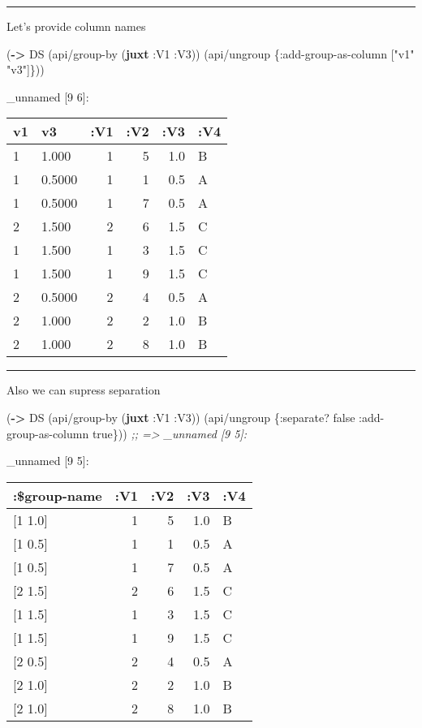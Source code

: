\documentclass[]{article}
\newenvironment{Shaded}{\begin{snugshade}}{\end{snugshade}}
\newcommand{\KeywordTok}[1]{\textcolor[rgb]{0.13,0.29,0.53}{\textbf{#1}}}
\newcommand{\StringTok}[1]{\textcolor[rgb]{0.31,0.60,0.02}{#1}}
\newcommand{\CommentTok}[1]{\textcolor[rgb]{0.56,0.35,0.01}{\textit{#1}}}
\newcommand{\VariableTok}[1]{\textcolor[rgb]{0.00,0.00,0.00}{#1}}
\newcommand{\AttributeTok}[1]{\textcolor[rgb]{0.77,0.63,0.00}{#1}}
\newcommand{\NormalTok}[1]{#1}
\begin{document}
\begin{center}\rule{0.5\linewidth}{0.5pt}\end{center}

Let's provide column names

\begin{Shaded}
\begin{Highlighting}[]
\NormalTok{(}\KeywordTok{->}\NormalTok{ DS}
\NormalTok{    (api/group-by (}\KeywordTok{juxt} \AttributeTok{:V1} \AttributeTok{:V3}\NormalTok{))}
\NormalTok{    (api/ungroup \{}\AttributeTok{:add-group-as-column}\NormalTok{ [}\StringTok{"v1"} \StringTok{"v3"}\NormalTok{]\}))}
\end{Highlighting}
\end{Shaded}

\_unnamed {[}9 6{]}:

\begin{longtable}[]{@{}llrrrl@{}}
\toprule
v1 & v3 & :V1 & :V2 & :V3 & :V4\tabularnewline
\midrule
\endhead
1 & 1.000 & 1 & 5 & 1.0 & B\tabularnewline
1 & 0.5000 & 1 & 1 & 0.5 & A\tabularnewline
1 & 0.5000 & 1 & 7 & 0.5 & A\tabularnewline
2 & 1.500 & 2 & 6 & 1.5 & C\tabularnewline
1 & 1.500 & 1 & 3 & 1.5 & C\tabularnewline
1 & 1.500 & 1 & 9 & 1.5 & C\tabularnewline
2 & 0.5000 & 2 & 4 & 0.5 & A\tabularnewline
2 & 1.000 & 2 & 2 & 1.0 & B\tabularnewline
2 & 1.000 & 2 & 8 & 1.0 & B\tabularnewline
\bottomrule
\end{longtable}

\begin{center}\rule{0.5\linewidth}{0.5pt}\end{center}

Also we can supress separation

\begin{Shaded}
\begin{Highlighting}[]
\NormalTok{(}\KeywordTok{->}\NormalTok{ DS}
\NormalTok{    (api/group-by (}\KeywordTok{juxt} \AttributeTok{:V1} \AttributeTok{:V3}\NormalTok{))}
\NormalTok{    (api/ungroup \{}\AttributeTok{:separate}\NormalTok{? }\VariableTok{false}
                  \AttributeTok{:add-group-as-column} \VariableTok{true}\NormalTok{\}))}
\CommentTok{;; => _unnamed [9 5]:}
\end{Highlighting}
\end{Shaded}

\_unnamed {[}9 5{]}:

\begin{longtable}[]{@{}lrrrl@{}}
\toprule
:\$group-name & :V1 & :V2 & :V3 & :V4\tabularnewline
\midrule
\endhead
{[}1 1.0{]} & 1 & 5 & 1.0 & B\tabularnewline
{[}1 0.5{]} & 1 & 1 & 0.5 & A\tabularnewline
{[}1 0.5{]} & 1 & 7 & 0.5 & A\tabularnewline
{[}2 1.5{]} & 2 & 6 & 1.5 & C\tabularnewline
{[}1 1.5{]} & 1 & 3 & 1.5 & C\tabularnewline
{[}1 1.5{]} & 1 & 9 & 1.5 & C\tabularnewline
{[}2 0.5{]} & 2 & 4 & 0.5 & A\tabularnewline
{[}2 1.0{]} & 2 & 2 & 1.0 & B\tabularnewline
{[}2 1.0{]} & 2 & 8 & 1.0 & B\tabularnewline
\bottomrule
\end{longtable}
\end{document}
